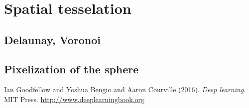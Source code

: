 \documentclass[12pt]{article}
\theoremstyle{plain}
\begin{document}



\section{Spatial tesselation}



\subsection{Delaunay, Voronoi}



\subsection{Pixelization of the sphere}



\newpage

\begin{thebibliography}{Nature}
%

\hypertarget{Deeplea_Goodfellow}{}
Ian Goodfellow and Yoshua Bengio and Aaron Courville (2016). \textit{Deep learning}. MIT Press. \url{http://www.deeplearningbook.org}

\end{thebibliography}
\end{document}
